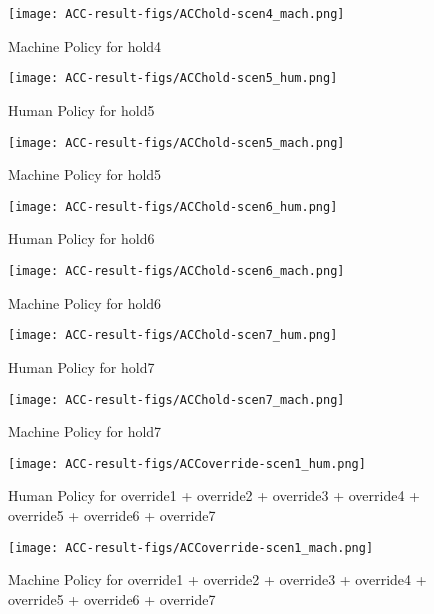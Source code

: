 \begin{figure}[h]
    \centering
    \texttt{[image: ACC-result-figs/ACChold-scen4\_mach.png]}
    \caption{Machine Policy for hold4}
    \label{fig:hold-s4-mach}
\end{figure}

\begin{figure}[h]
    \centering
    \texttt{[image: ACC-result-figs/ACChold-scen5\_hum.png]}
    \caption{Human Policy for hold5}
    \label{fig:hold-s5-hum}
\end{figure}

\begin{figure}[h]
    \centering
    \texttt{[image: ACC-result-figs/ACChold-scen5\_mach.png]}
    \caption{Machine Policy for hold5}
    \label{fig:hold-s5-mach}
\end{figure}

\begin{figure}[h]
    \centering
    \texttt{[image: ACC-result-figs/ACChold-scen6\_hum.png]}
    \caption{Human Policy for hold6}
    \label{fig:hold-s6-hum}
\end{figure}

\begin{figure}[h]
    \centering
    \texttt{[image: ACC-result-figs/ACChold-scen6\_mach.png]}
    \caption{Machine Policy for hold6}
    \label{fig:hold-s6-mach}
\end{figure}

\begin{figure}[h]
    \centering
    \texttt{[image: ACC-result-figs/ACChold-scen7\_hum.png]}
    \caption{Human Policy for hold7}
    \label{fig:hold-s7-hum}
\end{figure}

\begin{figure}[h]
    \centering
    \texttt{[image: ACC-result-figs/ACChold-scen7\_mach.png]}
    \caption{Machine Policy for hold7}
    \label{fig:hold-s7-mach}
\end{figure}

\begin{figure}[h]
    \centering
    \texttt{[image: ACC-result-figs/ACCoverride-scen1\_hum.png]}
    \caption{Human Policy for override1 + override2 + override3 + override4 + override5 + override6 + override7}
    \label{fig:override-s1-hum}
\end{figure}

\begin{figure}[h]
    \centering
    \texttt{[image: ACC-result-figs/ACCoverride-scen1\_mach.png]}
    \caption{Machine Policy for override1 + override2 + override3 + override4 + override5 + override6 + override7}
    \label{fig:override-s1-mach}
\end{figure}

